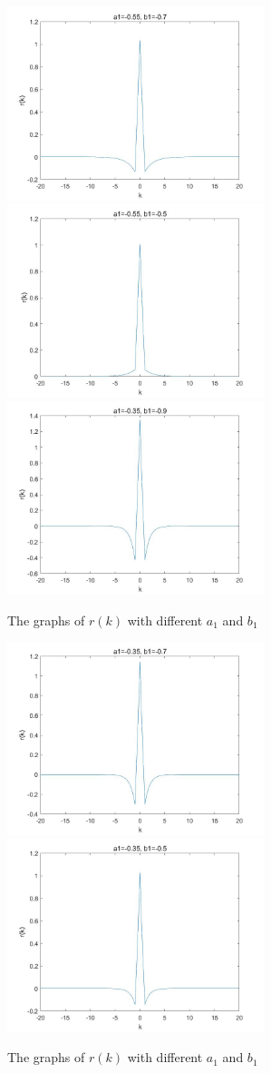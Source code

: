 \documentclass[UTF-8, a4paper, 12pt]{ctexart}
\begin{document}
\begin{figure}[htbp]
    \includegraphics[width=7.5cm]{1/8.jpg}
    \includegraphics[width=7.5cm]{1/9.jpg}
    \includegraphics[width=7.5cm]{1/10.jpg}
    \caption{The  graphs of $r(k)$ with different $a_1$ and $b_1$}
\end{figure}
\begin{figure}[htbp]
    \centering
    \includegraphics[width=7.5cm]{1/11.jpg}
    \includegraphics[width=7.5cm]{1/12.jpg}
    \caption{The  graphs of $r(k)$ with different $a_1$ and $b_1$}
\end{figure}
\end{document}
